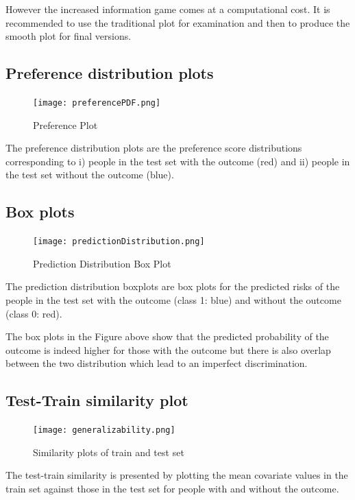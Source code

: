 \documentclass[]{article}
\begin{document}
However the increased information game comes at a computational cost. It
is recommended to use the traditional plot for examination and then to
produce the smooth plot for final versions.

\subsection{Preference distribution
plots}\label{preference-distribution-plots}

\begin{figure}
\centering
\texttt{[image: preferencePDF.png]}
\caption{Preference Plot}
\end{figure}

The preference distribution plots are the preference score distributions
corresponding to i) people in the test set with the outcome (red) and
ii) people in the test set without the outcome (blue).

\subsection{Box plots}\label{box-plots}

\begin{figure}
\centering
\texttt{[image: predictionDistribution.png]}
\caption{Prediction Distribution Box Plot}
\end{figure}

The prediction distribution boxplots are box plots for the predicted
risks of the people in the test set with the outcome (class 1: blue) and
without the outcome (class 0: red).

The box plots in the Figure above show that the predicted probability of
the outcome is indeed higher for those with the outcome but there is
also overlap between the two distribution which lead to an imperfect
discrimination.

\subsection{Test-Train similarity
plot}\label{test-train-similarity-plot}

\begin{figure}
\centering
\texttt{[image: generalizability.png]}
\caption{Similarity plots of train and test set}
\end{figure}

The test-train similarity is presented by plotting the mean covariate
values in the train set against those in the test set for people with
and without the outcome.
\end{document}
